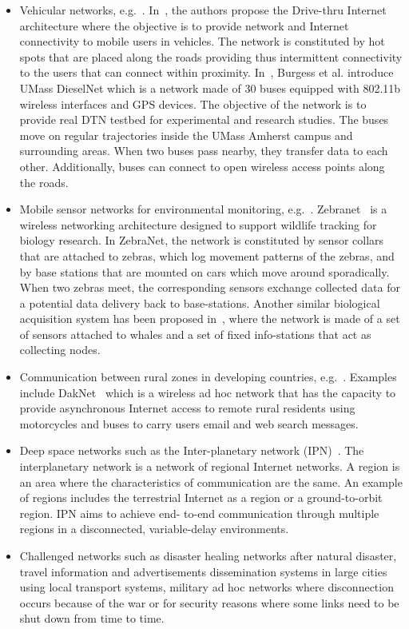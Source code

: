 \begin{itemize}
\item{Vehicular networks, e.g.~\cite{Levine:MaxProp, DriveThru}. In~\cite{DriveThru}, the authors propose the Drive-thru Internet architecture where the objective is to provide network and Internet connectivity
to mobile users in vehicles. The network is constituted by hot spots that are placed along the roads providing thus intermittent connectivity to the users that can
connect within proximity. In~\cite{Levine:MaxProp}, Burgess et al. introduce UMass DieselNet which is a network made of 30 buses equipped with 802.11b wireless interfaces and GPS devices. The objective of the network is to provide real DTN testbed for experimental and research studies. The buses move on regular trajectories inside the UMass Amherst campus and surrounding areas. When two buses pass nearby, they transfer data to each other. Additionally, buses can connect to open wireless access points
along the roads.}
\item{Mobile sensor networks for environmental monitoring, e.g.~\cite{zebranet02,WirelessInfostation}. Zebranet~\cite{zebranet02} is a wireless networking architecture designed to support wildlife tracking for biology research. In ZebraNet, the network is constituted by sensor collars that are attached to zebras, which log movement patterns of the zebras, and by base stations that are mounted on cars which move around sporadically. When two zebras meet, the corresponding sensors exchange collected data for a potential data delivery back to base-stations. Another similar biological acquisition system has been proposed in~\cite{WirelessInfostation}, where the network is made of a set of sensors attached to whales and a set of fixed info-stations that act as collecting nodes.}
\item{Communication between rural zones in developing countries, e.g.~\cite{Brewer:DTNdeveloping}. Examples include DakNet~\cite{Brewer:DTNdeveloping} which is a wireless ad hoc network that has the capacity to provide asynchronous Internet access to remote rural residents using motorcycles and buses to carry users email and web search messages.}
\item{Deep space networks such as the Inter-planetary network (IPN)~\cite{interplanetary03}. The interplanetary network is a network of regional Internet networks. A region is an area where the characteristics of communication are the same. An example of regions includes the terrestrial Internet as a region or a ground-to-orbit region. IPN aims to achieve end-
to-end communication through multiple regions in a disconnected, variable-delay environments.}
\item{Challenged networks such as disaster healing networks after natural disaster, travel information and advertisements dissemination systems in large cities using local transport systems, military ad hoc networks where disconnection occurs because of the war or for security reasons where some links need to be shut down from time to time.}
\end{itemize}

